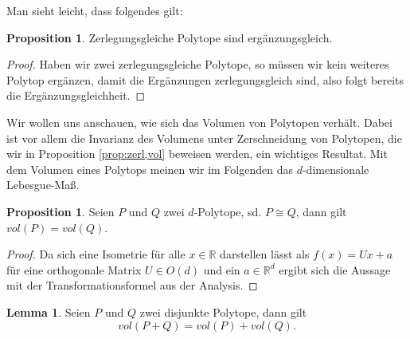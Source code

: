 \documentclass[11pt,titlepage]{article}
\newcommand{\setR}{\mathbb{R}}
\theoremstyle{definition}
\newtheorem{proposition}[theorem]{Proposition}
\newtheorem{lemma}[theorem]{Lemma}
\theoremstyle{remark}
\begin{document}
	Man sieht leicht, dass folgendes gilt:
	
	\begin{proposition} \label{prop:zerl,erg}
		Zerlegungsgleiche Polytope sind ergänzungsgleich.
	\end{proposition}
	
	\begin{proof}	
		Haben wir zwei zerlegungsgleiche Polytope, so müssen wir kein weiteres Polytop ergänzen, damit die Ergänzungen zerlegungsgleich sind, also folgt bereits die Ergänzungsgleichheit.
	\end{proof}
	

	Wir wollen uns anschauen, wie sich das Volumen von Polytopen verhält. Dabei ist 
	vor allem die Invarianz des Volumens unter Zerschneidung von Polytopen, die wir in Proposition \ref{prop:zerl,vol} beweisen werden, ein wichtiges Resultat. Mit dem Volumen eines Polytops 
	meinen wir im Folgenden das $d$-dimensionale Lebesgue-Maß.
	
	\begin{proposition} \label{prop:cong,vol}
		Seien $P$ und $Q$ zwei $d$-Polytope, sd. $P\cong Q$, dann gilt $vol(P)=vol(Q)$.
	\end{proposition}
	
	\begin{proof}
		Da sich eine Isometrie für alle $x\in\setR$ darstellen lässt als $f(x)=Ux+a$ für eine orthogonale Matrix $U\in O(d)$ und ein 
		$a\in\setR^d$ ergibt sich die Aussage mit der Transformationsformel 
		aus der Analysis.
	\end{proof}
	
	\begin{lemma}\label{lemma:nullmenge}
		Seien $P$ und $Q$ zwei disjunkte Polytope, dann gilt
		\[ vol(P+Q)=vol(P)+vol(Q).\]
	\end{lemma}
\end{document}
